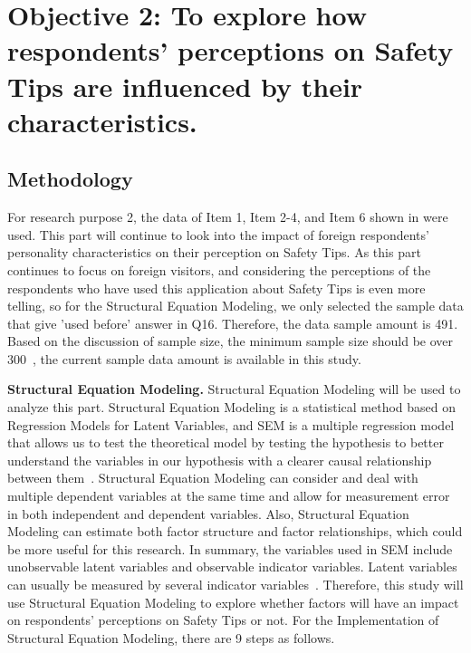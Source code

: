 \chapter{Objective 2: To explore how respondents' perceptions on Safety Tips are influenced by their characteristics.}
\label{c5}

\section{Methodology}


For research purpose 2, the data of Item 1, Item 2-4, and Item 6 shown in  were used. This part will continue to look into the impact of foreign respondents' personality characteristics on their perception on Safety Tips. As this part continues to focus on foreign visitors, and considering the perceptions of the respondents who have used this application about Safety Tips is even more telling, so for the Structural Equation Modeling, we only selected the sample data that give 'used before' answer in Q16. Therefore, the data sample amount is 491. Based on the discussion of sample size, the minimum sample size should be over 300~\cite{ref15}, the current sample data amount is available in this study. 

\textbf{Structural Equation Modeling.} Structural Equation Modeling will be used to analyze this part. Structural Equation Modeling is a statistical method based on Regression Models for Latent Variables, and SEM is a multiple regression model that allows us to test the theoretical model by testing the hypothesis to better understand the variables in our hypothesis with a clearer causal relationship between them~\cite{ref13}. Structural Equation Modeling can consider and deal with multiple dependent variables at the same time and allow for measurement error in both independent and dependent variables. Also, Structural Equation Modeling can estimate both factor structure and factor relationships, which could be more useful for this research. In summary, the variables used in SEM include unobservable latent variables and observable indicator variables. Latent variables can usually be measured by several indicator variables~\cite{ref14}. Therefore, this study will use Structural Equation Modeling to explore whether factors will have an impact on respondents' perceptions on Safety Tips or not. For the Implementation of Structural Equation Modeling, there are 9 steps as follows. 

